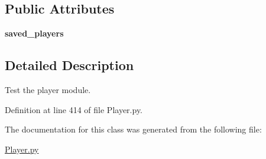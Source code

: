 \subsection*{Public Attributes}
\begin{DoxyCompactItemize}
\item 
\hypertarget{class_player_1_1_player_module_test_a68d54703cca9d4207212b84170066bcb}{
{\bfseries saved\_\-players}}
\label{class_player_1_1_player_module_test_a68d54703cca9d4207212b84170066bcb}

\end{DoxyCompactItemize}


\subsection{Detailed Description}
Test the player module. 

Definition at line 414 of file Player.py.



The documentation for this class was generated from the following file:\begin{DoxyCompactItemize}
\item 
\hyperlink{_player_8py}{Player.py}\end{DoxyCompactItemize}
